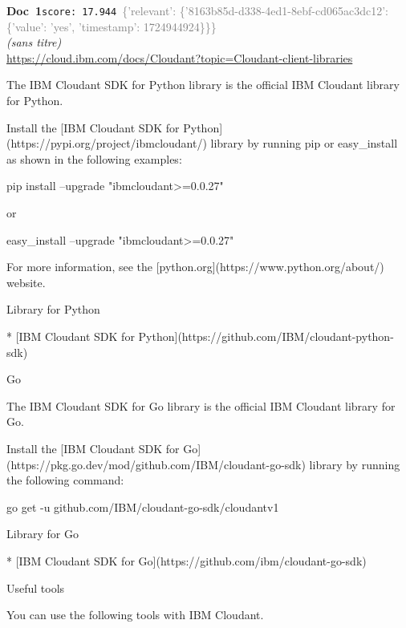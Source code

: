 \documentclass[a4paper,11pt]{article}
\begin{document}
\begin{docenv}
{\footnotesize\textcolor{doccolor}{\textbf{Doc~1}}}\hfill{\tiny\texttt{score:~17.944}}\ {\tiny\textcolor{gray}{\{'relevant': \{'8163b85d-d338-4ed1-8ebf-cd065ac3dc12': \{'value': 'yes', 'timestamp': 1724944924\}\}\}}}\\[3pt]
{\small\textit{(sans titre)}}\\[2pt]
{\tiny\url{https://cloud.ibm.com/docs/Cloudant?topic=Cloudant-client-libraries}}\\[4pt]
{\footnotesize 
The IBM Cloudant SDK for Python library is the official IBM Cloudant library for Python.

Install the [IBM Cloudant SDK for Python](https://pypi.org/project/ibmcloudant/) library by running pip or easy\_install as shown in the following examples:

pip install --upgrade "ibmcloudant>=0.0.27"

or

easy\_install --upgrade "ibmcloudant>=0.0.27"

For more information, see the [python.org](https://www.python.org/about/) website.



 Library for Python 



* [IBM Cloudant SDK for Python](https://github.com/IBM/cloudant-python-sdk)









 Go 

The IBM Cloudant SDK for Go library is the official IBM Cloudant library for Go.

Install the [IBM Cloudant SDK for Go](https://pkg.go.dev/mod/github.com/IBM/cloudant-go-sdk) library by running the following command:

go get -u github.com/IBM/cloudant-go-sdk/cloudantv1



 Library for Go 



* [IBM Cloudant SDK for Go](https://github.com/ibm/cloudant-go-sdk)









 Useful tools 

You can use the following tools with IBM Cloudant.



}
\end{docenv}
\end{document}
